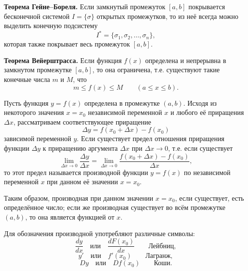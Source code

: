 \begin{rusblock}
\textbf{Теорема Гейне--Бореля.} Если замкнутый промежуток $[a,b]$ покрывается бесконечной системой $I=\{\sigma\}$ открытых промежутков, то из неё всегда можно выделить конечную подсистему
\[
I^*=\{\sigma_1,\sigma_2,\ldots,\sigma_n\},
\]
которая также покрывает весь промежуток $[a,b]$.

\textbf{Теорема Вейерштрасса.} Если функция $f(x)$ определена и непрерывна в замкнутом промежутке $[a,b]$, то она ограничена, т.е. существуют такие конечные числа $m$ и $M$, что
\[
m\le f(x)\le M\qquad (a\le x\le b).
\]
\end{rusblock}

\begin{rusblock}
Пусть функция $y=f(x)$ определена в промежутке $(a,b)$. Исходя из некоторого значения $x=x_0$ независимой переменной $x$ и любого её приращения $\Delta x$, рассматриваем соответствующее приращение
\[
\Delta y=f(x_0+\Delta x)-f(x_0)
\]
зависимой переменной $y$. Если существует предел отношения приращения функции $\Delta y$ к приращению аргумента $\Delta x$ при $\Delta x\to0$, т.е. если существует
\[
\lim_{\Delta x\to0}\frac{\Delta y}{\Delta x}
=\lim_{\Delta x\to0}\frac{f(x_0+\Delta x)-f(x_0)}{\Delta x},
\]
то этот предел называется производной функции $y=f(x)$ по независимой переменной $x$ при данном её значении $x=x_0$.

Таким образом, производная при данном значении $x=x_0$, если существует, есть определённое число; если же производная существует во всём промежутке $(a,b)$, то она является функцией от $x$.

Для обозначения производной употребляют различные символы:
\[
\frac{dy}{dx}\quad\text{или}\quad \frac{dF(x_0)}{dx}\qquad\text{Лейбниц},
\]
\[
y'\quad\text{или}\quad f'(x_0)\qquad\text{Лагранж},
\]
\[
Dy\quad\text{или}\quad Df(x_0)\qquad\text{Коши}.
\]
\end{rusblock}

